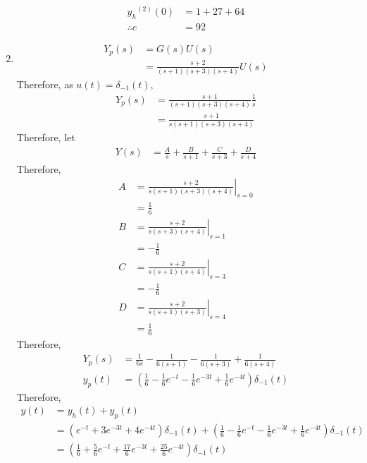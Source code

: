 \documentclass[fleqn, a4paper, 11pt, oneside]{amsart}
\theoremstyle{definition}
\theoremstyle{theorem}
\begin{document}
\begin{solution}
\begin{enumerate}[leftmargin=*]
\begin{align*}
				{y_h}^{(2)}(0) & = 1 + 27 + 64 \\
				\therefore c   & = 92
			\end{align*}
		\item
			\begin{align*}
				Y_p(s) & = G(s) U(s) \\
                       & = \frac{s + 2}{(s + 1) (s + 3) (s + 4)} U(s)
			\end{align*}
			Therefore, as $u(t) = \delta_{-1}(t)$,
			\begin{align*}
				Y_p(s) & = \frac{s + 1}{(s + 1) (s + 3) (s + 4)} \frac{1}{s} \\
                       & = \frac{s + 1}{s (s + 1) (s + 3) (s + 4)}
			\end{align*}
			Therefore, let
			\begin{align*}
				Y(s) & = \frac{A}{s} + \frac{B}{s + 1} + \frac{C}{s + 3} + \frac{D}{s + 4}
			\end{align*}
			Therefore,
			\begin{align*}
				A & = \left. \frac{s + 2}{s (s + 1) (s + 3) (s + 4)} \right|_{s = 0} \\
                  & = \frac{1}{6}                                                    \\
				B & = \left. \frac{s + 2}{s (s + 3) (s + 4)} \right|_{s = 1}         \\
                  & = -\frac{1}{6}                                                   \\
				C & = \left. \frac{s + 2}{s (s + 1) (s + 4)} \right|_{s = 3}         \\
                  & = -\frac{1}{6}                                                   \\
				D & = \left. \frac{s + 2}{s (s + 1) (s + 3)} \right|_{s = 4}         \\
                  & = \frac{1}{6}
			\end{align*}
			Therefore,
			\begin{align*}
				Y_p(s) & = \frac{1}{6 s} - \frac{1}{6 (s + 1)} - \frac{1}{6 (s + 3)} + \frac{1}{6 (s + 4)} \\
				y_p(t) & = \left( \frac{1}{6} - \frac{1}{6} e^{-t} - \frac{1}{6} e^{-3 t} + \frac{1}{6} e^{-4 t} \right) \delta_{-1}(t)
			\end{align*}
			Therefore,
			\begin{align*}
				y(t) & = y_h(t) + y_p(t)                                                                                                                                                               \\
                     & = \left( e^{-t} + 3 e^{-3 t} + 4 e^{-4 t} \right) \delta_{-1}(t) + \left( \frac{1}{6} - \frac{1}{6} e^{-t} - \frac{1}{6} e^{-3 t} + \frac{1}{6} e^{-4 t} \right) \delta_{-1}(t) \\
                     & = \left( \frac{1}{6} + \frac{5}{6} e^{-t} + \frac{17}{6} e^{-3 t} + \frac{25}{6} e^{-4 t} \right) \delta_{-1}(t)
			\end{align*}
	\end{enumerate}
\end{solution}
\end{document}
